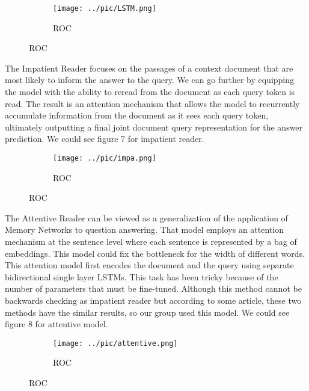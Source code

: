 \documentclass[runningheads,a4paper]{llncs}
\begin{document}
\begin{figure}[p]
	\centering
	\begin{subfigure}{.5\textwidth}
		\centering
		\texttt{[image: ../pic/LSTM.png]}
		\caption{ROC}
		\label{figure 6:LSTM}
	\end{subfigure}
	
\end{figure}



The Impatient Reader focuses on the passages of a context document that are most likely to inform the answer to the query. We can go further by equipping the model with the ability to reread from the document as each query token is read. The result is an attention mechanism that allows the model to recurrently accumulate information from the document as it sees each query token, ultimately outputting a final joint document query representation for the answer prediction. We could see figure 7 for impatient reader.
\begin{figure}[p]
	\centering
	\begin{subfigure}{.5\textwidth}
		\centering
		\texttt{[image: ../pic/impa.png]}
		\caption{ROC}
		\label{figure 7:impatient reader}
	\end{subfigure}
	
\end{figure}

The Attentive Reader can be viewed as a generalization of the application of Memory Networks to question answering. That model employs an attention mechanism at the sentence level where each sentence is represented by a bag of embeddings. This model could fix the bottleneck for the width of different words. This attention model first encodes the document and the query using separate bidirectional single layer LSTMs. This task has been tricky because of the number of parameters that must be fine-tuned.
Although this method cannot be backwards checking as impatient reader but according to some article, these two methods have the similar results, so our group used this model. We could see figure 8 for attentive model.
\begin{figure}[p]
	\centering
	\begin{subfigure}{.5\textwidth}
		\centering
		\texttt{[image: ../pic/attentive.png]}
		\caption{ROC}
		\label{figure 8:attentive model}
	\end{subfigure}
	
\end{figure}
\end{document}
